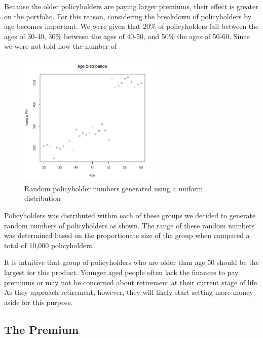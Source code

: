 \documentclass[12pt]{article}
\begin{document}
Because the older policyholders are paying larger premiums, their effect is greater on the portfolio. For this reason, considering the breakdown of policyholders by age becomes important. We were given that 20\% of policyholders fall between the ages of 30-40, 30\% between the ages of 40-50, and 50\% the ages of 50-60. Since we were not told how the number of

\begin{figure}[!ht]
\begin{center}
\includegraphics[width=0.6\textwidth]{images/ageDistribution}
\end{center}
\caption{Random policyholder numbers generated using a uniform distribution}
\end{figure}

Policyholders was distributed within each of these groups we decided to generate random numbers of policyholders as shown. The range of these random numbers was determined based on the proportionate size of the group when compared a total of 10,000 policyholders. %

It is intuitive that group of policyholders who are older than age 50 should be the largest for this product. Younger aged people often lack the finances to pay premiums or may not be concerned about retirement at their current stage of life. As they approach retirement, however, they will likely start setting more money aside for this purpose.

\subsection{The Premium}
\end{document}
